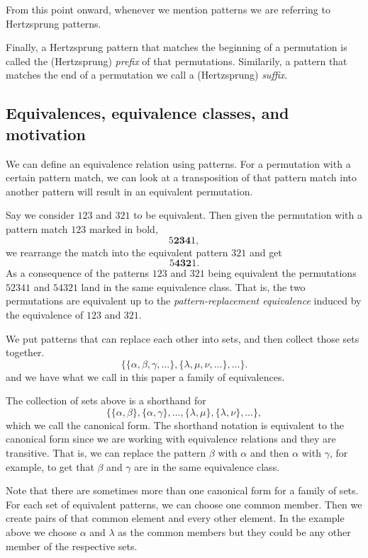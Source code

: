 \documentclass[a4paper, 11pt, english]{article}
\theoremstyle{definition}
\begin{document}
From this point onward, whenever we mention patterns we are referring to
Hertzsprung patterns.

Finally, a Hertzsprung pattern that matches the beginning of a permutation is
called the (Hertzsprung) \emph{prefix} of that permutations. Similarily, a pattern
that matches the end of a permutation we call a (Hertzsprung) \emph{suffix}.

\subsection{Equivalences, equivalence classes, and motivation}
We can define an equivalence relation using patterns. For a permutation with a certain pattern
match, we can look at a transposition of that pattern match into another pattern will result in an
equivalent permutation. 

Say we consider $123$ and $321$ to be equivalent. Then given the
permutation with a pattern match $123$ marked in bold,
\[
  5\bm{234}1,
\]
we rearrange the match into the equivalent pattern $321$ and get
\[
  5\bm{432}1.
\]
As a consequence of the patterns $123$ and $321$ being equivalent the permutations $52341$ and
$54321$ land in the same equivalence class. That is, the two permutations are equivalent up to the
\emph{pattern-replacement equivalence} induced by the equivalence of $123$ and $321$.

We put patterns that can replace each other into sets, and then collect those sets together. 
\[
    \{ \{\alpha, \beta, \gamma, \dots \}, \{\lambda, \mu, \nu, \dots \}, \dots
    \}.
\]
and we have what we call in this paper a family of equivalences.

The collection of sets above is a shorthand for
\[
    \{ \{ \alpha, \beta \}, \{ \alpha, \gamma \}, \dots, \{ \lambda, \mu \}, \{
        \lambda, \nu \}, \dots \},
\] 
which we call the canonical form. The shorthand notation is equivalent to the canonical form since
we are working with equivalence relations and they are transitive.
That is, we can replace the pattern $\beta$ with $\alpha$ and then $\alpha$ with $\gamma$, for
example, to get that $\beta$ and $\gamma$ are in the same equivalence class.

Note that there are sometimes more than one canonical form for a family of sets. For each 
set of equivalent patterns, we can choose one common member. Then we create pairs of that common
element and every other element. In the example above we choose $\alpha$ and $\lambda$ as the common members
but they could be any other member of the respective sets.
\end{document}
